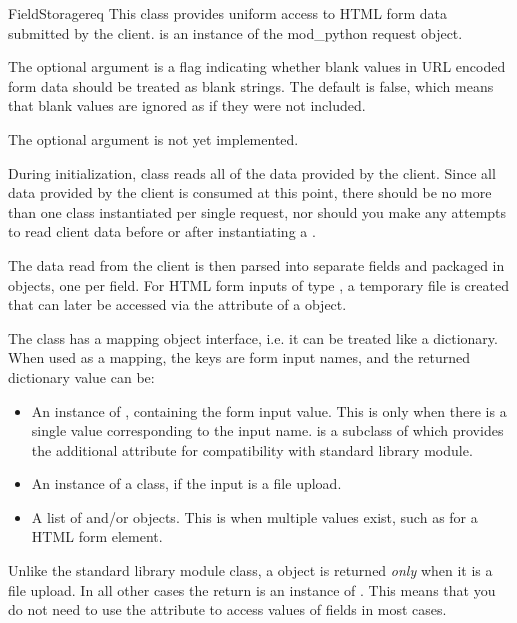 \begin{classdesc}{FieldStorage}{req}
  This class provides uniform access to HTML form data submitted by the
  client.   is an instance of the mod_python request object.

  The optional argument  is a flag indicating
  whether blank values in URL encoded form data should be treated as
  blank strings. The default is false, which means that blank values are
  ignored as if they were not included.

  The optional argument  is not yet implemented.

  During initialization,  class reads all of the
  data provided by the client. Since all data provided by the client is
  consumed at this point, there should be no more than one
   class instantiated per single request, nor should
  you make any attempts to read client data before or after
  instantiating a .

  The data read from the client is then parsed into separate fields and
  packaged in  objects, one per field. For HTML form inputs
  of type , a temporary file is created that can later be
  accessed via the  attribute of a  object.

  The  class has a mapping object interface, i.e. it
  can be treated like a dictionary. When used as a mapping, the keys are
  form input names, and the returned dictionary value can be:

  \begin{itemize}
  \item
    An instance of , containing the form input
    value. This is only when there is a single value corresponding to the
    input name.  is a subclass of  which
    provides the additional  attribute for compatibility
    with standard library  module.
  \item
    An instance of a  class, if the input is a file upload.
  \item
    A list of  and/or  objects. This is
    when multiple values exist, such as for a  HTML form
    element.
  \end{itemize}

  \begin{notice}
    Unlike the standard library  module
     class, a  object is returned
    \emph{only} when it is a file upload. In all other cases the
    return is an instance of . This means that you
    do not need to use the  attribute to access values
    of fields in most cases.
  \end{notice}


\end{classdesc}
